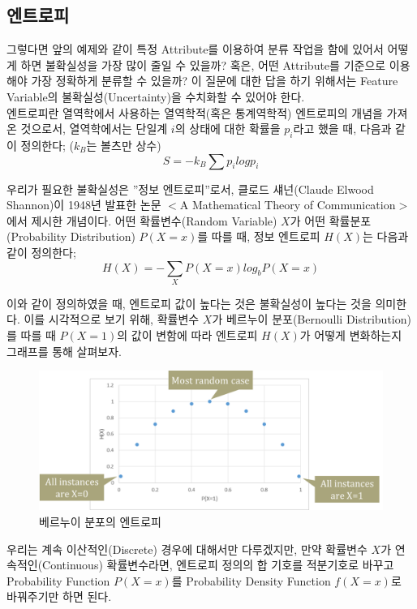 \documentclass[a4paper]{oblivoir}
\begin{document}
\subsection{엔트로피}
그렇다면 앞의 예제와 같이 특정 Attribute를 이용하여 분류 작업을 함에 있어서 어떻게 하면 불확실성을 가장 많이 줄일 수 있을까? 혹은, 어떤 Attribute를 기준으로 이용해야 가장 정확하게 분류할 수 있을까? 이 질문에 대한 답을 하기 위해서는 Feature Variable의 불확실성(Uncertainty)을 수치화할 수 있어야 한다. \\
\indent 엔트로피란 열역학에서 사용하는 열역학적(혹은 통계역학적) 엔트로피의 개념을 가져온 것으로서, 열역학에서는 단일계 $i$의 상태에 대한 확률을 $p_{i}$라고 했을 때, 다음과 같이 정의한다; ($k_{B}$는 볼츠만 상수)
\begin{equation}
S = -k_{B}\sum p_{i}logp_{i} \tag{2-2}
\end{equation}

\indent 우리가 필요한 불확실성은 ''정보 엔트로피''로서, 클로드 섀넌(Claude Elwood Shannon)이 1948년 발표한 논문 $<$A Mathematical Theory of Communication$>$에서 제시한 개념이다. 어떤 확률변수(Random Variable) $X$가 어떤 확률분포(Probability Distribution) $P(X=x)$를 따를 때, 정보 엔트로피 $H(X)$는 다음과 같이 정의한다;
\begin{equation}
H(X) = -\sum_{X}P(X=x)log_{b}P(X=x) \tag{2-3}
\end{equation}

\indent 이와 같이 정의하였을 때, 엔트로피 값이 높다는 것은 불확실성이 높다는 것을 의미한다. 이를 시각적으로 보기 위해, 확률변수 $X$가 베르누이 분포(Bernoulli Distribution)를 따를 때 $P(X=1)$의 값이 변함에 따라 엔트로피 $H(X)$가 어떻게 변화하는지 그래프를 통해 살펴보자. 
\begin{figure}[ht]
\centering
\includegraphics[scale=0.7]{Entropy.png}
\caption{베르누이 분포의 엔트로피}
\label{Figure 2-14}
\end{figure}

\indent 우리는 계속 이산적인(Discrete) 경우에 대해서만 다루겠지만, 만약 확률변수 $X$가 연속적인(Continuous) 확률변수라면, 엔트로피 정의의 합 기호를 적분기호로 바꾸고 Probability Function $P(X=x)$를 Probability Density Function $f(X=x)$로 바꿔주기만 하면 된다.
\end{document}
